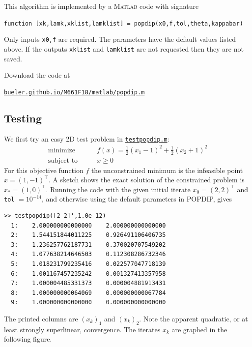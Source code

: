 \documentclass[11pt]{article}
\newcommand{\Matlab}{\textsc{Matlab}\xspace}
\begin{document}
This algorithm is implemented by a \Matlab code with signature
\begin{center}
\texttt{function [xk,lamk,xklist,lamklist] = popdip(x0,f,tol,theta,kappabar)}
\end{center}
Only inputs \texttt{x0,f} are required.  The parameters have the default values listed above.  If the outputs \texttt{xklist} and \texttt{lamklist} are not requested then they are not saved.

Download the code at
\begin{center}
    \href{http://bueler.github.io/M661F18/matlab/popdip.m}{\texttt{bueler.github.io/M661F18/matlab/popdip.m}}
\end{center}


\subsection*{Testing}

We first try an easy 2D test problem in \href{http://bueler.github.io/M661F18/matlab/testpopdip.m}{\texttt{testpopdip.m}}:
\begin{equation}
\begin{matrix}
\text{minimize} \qquad & f(x) = \frac{1}{2} (x_1-1)^2 + \frac{1}{2} (x_2+1)^2 \\
\text{subject to} \qquad & x \ge 0
\end{matrix} \label{testoneproblem}
\end{equation}
For this objective function $f$ the unconstrained minimum is the infeasible point $\hat x =(1,-1)^\top$.  A sketch shows the exact solution of the constrained problem is $x_*=(1,0)^\top$.  Running the code with the given initial iterate $x_0=(2,2)^\top$ and \texttt{tol} $=10^{-14}$, and otherwise using the default parameters in POPDIP, gives
\begin{Verbatim}[fontsize=\small]
>> testpopdip([2 2]',1.0e-12)
  1:    2.000000000000000    2.000000000000000
  2:    1.544151844011225    0.926491106406735
  3:    1.236257762187731    0.370020707549202
  4:    1.077638214646503    0.112308286732346
  5:    1.018231799235416    0.022577047718139
  6:    1.001167457235242    0.001327413357958
  7:    1.000004485331373    0.000004881913431
  8:    1.000000000064069    0.000000000067784
  9:    1.000000000000000    0.000000000000000
\end{Verbatim}
The printed columns are $(x_k)_1$ and $(x_k)_2$.  Note the apparent quadratic, or at least strongly superlinear, convergence.  The iterates $x_k$ are graphed in the following figure.
\end{document}
